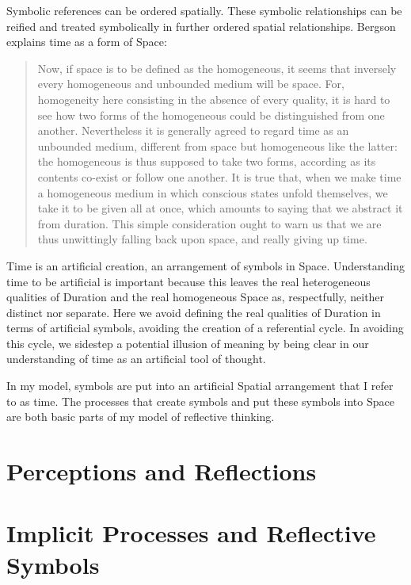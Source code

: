 Symbolic references can be ordered spatially.  These symbolic
relationships can be reified and treated symbolically in further
ordered spatial relationships.  Bergson explains time as a form of
Space:

\begin{quote}
Now, if space is to be defined as the homogeneous, it seems that
inversely every homogeneous and unbounded medium will be space.  For,
homogeneity here consisting in the absence of every quality, it is
hard to see how two forms of the homogeneous could be distinguished
from one another.  Nevertheless it is generally agreed to regard time
as an unbounded medium, different from space but homogeneous like the
latter: the homogeneous is thus supposed to take two forms, according
as its contents co-exist or follow one another.  It is true that, when
we make time a homogeneous medium in which conscious states unfold
themselves, we take it to be given all at once, which amounts to
saying that we abstract it from duration.  This simple consideration
ought to warn us that we are thus unwittingly falling back upon space,
and really giving up time.
\end{quote}

Time is an artificial creation, an arrangement of symbols in Space.
Understanding time to be artificial is important because this leaves
the real heterogeneous qualities of Duration and the real homogeneous
Space as, respectfully, neither distinct nor separate.  Here we avoid
defining the real qualities of Duration in terms of artificial
symbols, avoiding the creation of a referential cycle.  In avoiding
this cycle, we sidestep a potential illusion of meaning by being clear
in our understanding of time as an artificial tool of thought.

In my model, symbols are put into an artificial Spatial arrangement
that I refer to as time.  The processes that create symbols and put
these symbols into Space are both basic parts of my model of
reflective thinking.

\section{Perceptions and Reflections}



\section{Implicit Processes and Reflective Symbols}




